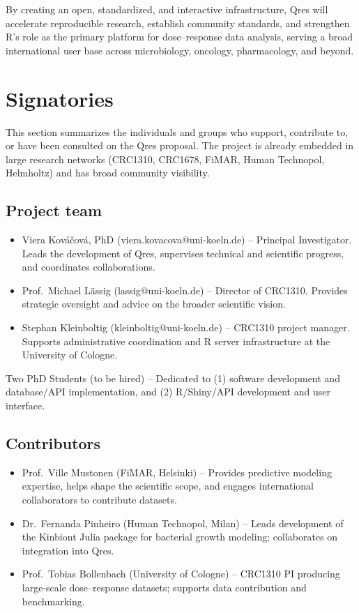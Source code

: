 \documentclass[
]{article}
\providecommand{\tightlist}{%
  \setlength{\itemsep}{0pt}\setlength{\parskip}{0pt}}
\begin{document}
By creating an open, standardized, and interactive infrastructure, Qres
will accelerate reproducible research, establish community standards,
and strengthen R's role as the primary platform for dose--response data
analysis, serving a broad international user base across microbiology,
oncology, pharmacology, and beyond.

\section{Signatories}\label{signatories}

This section summarizes the individuals and groups who support,
contribute to, or have been consulted on the Qres proposal. The project
is already embedded in large research networks (CRC1310, CRC1678, FiMAR,
Human Technopol, Helmholtz) and has broad community visibility.

\subsection{Project team}\label{project-team}

\begin{itemize}
\tightlist
\item
  Viera Kováčová, PhD (viera.kovacova@uni-koeln.de) -- Principal
  Investigator. Leads the development of Qres, supervises technical and
  scientific progress, and coordinates collaborations.
\item
  Prof.~Michael Lässig (lassig@uni-koeln.de) -- Director of CRC1310.
  Provides strategic oversight and advice on the broader scientific
  vision.
\item
  Stephan Kleinboltig (kleinboltig@uni-koeln.de) -- CRC1310 project
  manager. Supports administrative coordination and R server
  infrastructure at the University of Cologne.
\end{itemize}

Two PhD Students (to be hired) -- Dedicated to (1) software development
and database/API implementation, and (2) R/Shiny/API development and
user interface.

\subsection{Contributors}\label{contributors}

\begin{itemize}
\tightlist
\item
  Prof.~Ville Mustonen (FiMAR, Helsinki) -- Provides predictive modeling
  expertise, helps shape the scientific scope, and engages international
  collaborators to contribute datasets.
\item
  Dr.~Fernanda Pinheiro (Human Technopol, Milan) -- Leads development of
  the Kinbiont Julia package for bacterial growth modeling; collaborates
  on integration into Qres.
\item
  Prof.~Tobias Bollenbach (University of Cologne) -- CRC1310 PI
  producing large-scale dose--response datasets; supports data
  contribution and benchmarking.
\end{itemize}
\end{document}
